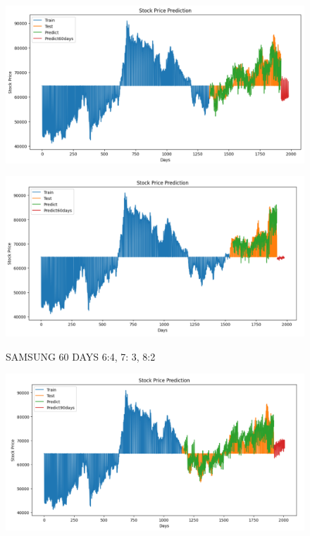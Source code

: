 \documentclass{article}
\begin{document}
\begin{multicols}{2}
\begin{figure}[H]
\begin{minipage}{0.15\textwidth}
    \label{fig:1}
    \end{minipage}%
    \begin{minipage}{0.15\textwidth}
    \centering
    \includegraphics[width=1\textwidth]{Image/N_Beat/N_BEAT_7_3_SAMSUNG_60DAYS.png}
  
    \label{fig:2}
    \end{minipage}%
    \begin{minipage}{0.15\textwidth}
    \centering
    \includegraphics[width=1\textwidth]{Image/N_Beat/N_BEAT_8_2_SAMSUNG_60DAYS.png}

    \label{fig:3}
    \end{minipage}
    \caption{SAMSUNG 60 DAYS  6:4, 7: 3, 8:2 }
\end{figure}


\begin{figure}[H]
    \centering
    \begin{minipage}{0.15\textwidth}
    \centering
    \includegraphics[width=1\textwidth]{Image/N_Beat/N_BEAT_6_4_SAMSUNG_90DAYS.png}
   

\end{minipage}
\end{figure}
\end{multicols}
\end{document}
